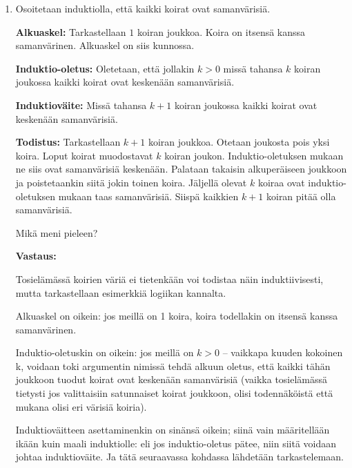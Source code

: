 \documentclass[a4paper,12pt]{article}
\begin{document}
\begin{enumerate}
\underline{Johtopäätös:} Alkuaskeleesta ja induktioaskeleesta seuraa induktioperiaatteen nojalla, että kaikilla $n\in \N$ pätee yhtälö
\begin{equation*}
    \sum_{k=1}^n k^3 =\frac{n^2(n+1)^2}{4}.
\end{equation*} \vspace{1em}

\item Osoitetaan induktiolla, ett\"a kaikki koirat ovat samanv\"arisi\"a.

\noindent \textbf{Alkuaskel:} Tarkastellaan $1$ koiran joukkoa. Koira on itsens\"a kanssa samanv\"arinen. Alkuaskel on siis kunnossa.

\noindent \textbf{Induktio-oletus:} Oletetaan, ett\"a jollakin $k>0$ miss\"a tahansa $k$ koiran joukossa kaikki koirat ovat kesken\"a\"an samanv\"arisi\"a.

\noindent \textbf{Induktiov\"aite:} Miss\"a tahansa $k+1$ koiran joukossa kaikki koirat ovat kesken\"a\"an samanv\"arisi\"a.

\textbf{Todistus:} Tarkastellaan $k+1$ koiran joukkoa. Otetaan joukosta pois yksi koira. Loput koirat muodostavat $k$ koiran joukon. Induktio-oletuksen mukaan ne siis ovat samanv\"arisi\"a kesken\"a\"an. Palataan takaisin alkuper\"aiseen joukkoon ja poistetaankin siit\"a jokin toinen koira. J\"aljell\"a olevat $k$ koiraa ovat induktio-oletuksen mukaan taas samanv\"arisi\"a. Siisp\"a kaikkien $k+1$ koiran pit\"a\"a olla samanv\"arisi\"a.

Mik\"a meni pieleen?

\textbf{Vastaus:} 

Tosielämässä koirien väriä ei tietenkään voi todistaa näin induktiivisesti, mutta tarkastellaan esimerkkiä logiikan kannalta.

Alkuaskel on oikein: jos meillä on 1 koira, koira todellakin on itsensä kanssa samanvärinen. 

Induktio-oletuskin on oikein: jos meillä on $k > 0$ -- vaikkapa kuuden kokoinen k, voidaan toki argumentin nimissä tehdä alkuun oletus, että kaikki tähän joukkoon tuodut koirat ovat keskenään samanvärisiä (vaikka tosielämässä tietysti jos valittaisiin satunnaiset koirat joukkoon, olisi todennäköistä että mukana olisi eri värisiä koiria).

Induktioväitteen asettaminenkin on sinänsä oikein; siinä vain määritellään ikään kuin maali induktiolle: eli jos induktio-oletus pätee, niin siitä voidaan johtaa induktioväite. Ja tätä seuraavassa kohdassa lähdetään tarkastelemaan. 


\end{enumerate}
\end{document}
